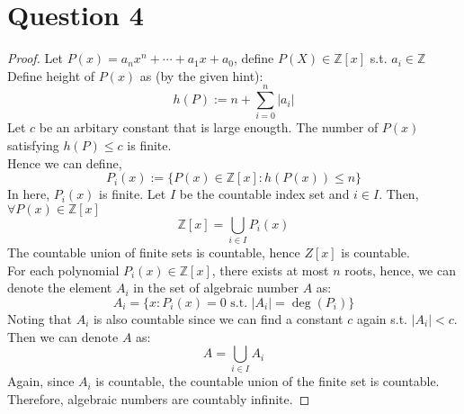 \documentclass{article}
\begin{document}
\section*{Question 4}
\begin{proof}
    Let $P(x) = a_nx^n + \cdots + a_1x + a_0$, define $P(X) \in \mathbb{Z}[x]$ s.t. $a_i \in \mathbb{Z}$
    \\
    Define height of $P(x)$ as (by the given hint):
    \[ h(P) := n + \sum_{i = 0}^{n} |a_i| \]
    Let $c$ be an arbitary constant that is large enougth. The number of $P(x)$ satisfying $h(P) \leq c$ is finite.
    \\
    Hence we can define,
    \[ P_i(x) := \{ P(x) \in \mathbb{Z}[x]: h(P(x)) \leq n \} \]
    In here, $P_i(x)$ is finite. Let $I$ be the countable index set and $i \in I$. Then, $\forall P(x) \in \mathbb{Z}[x]$
    \[ \mathbb{Z}[x] = \bigcup_{i \in I} P_i(x) \]
    The countable union of finite sets is countable, hence $Z[x]$ is countable.
    \\
    For each polynomial $P_i(x) \in \mathbb{Z}[x]$, there exists at most $n$ roots, hence, we can denote the element $A_i$ in the set of algebraic number $A$ as:
    \[ A_i = \{ x: P_i(x) = 0 \text{ s.t. } |A_i| = \deg(P_i) \} \]
    Noting that $A_i$ is also countable since we can find a constant $c$ again s.t. $|A_i| < c$. Then we can denote $A$ as:
    \[ A = \bigcup_{i \in I} A_i \]
    Again, since $A_i$ is countable, the countable union of the finite set is countable.
    \\
    Therefore, algebraic numbers are countably infinite.
\end{proof}
\end{document}
